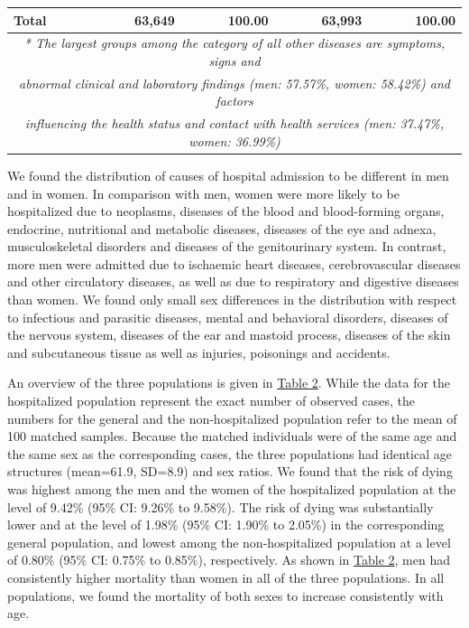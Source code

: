 \begin{table}[H]
\begin{tabular}{lrrrr}
    \midrule
    \textbf{Total } & \textbf{63,649} & \textbf{100.00} & \textbf{63,993} & \textbf{100.00} \\
    \bottomrule
    \bottomrule
\multicolumn{5}{c}{\textit{* The largest groups among the category of all other diseases are symptoms, signs and}}\\
\multicolumn{5}{c}{\textit{abnormal clinical and laboratory findings (men: 57.57\%, women: 58.42\%) and factors}} \\
\multicolumn{5}{c}{\textit{influencing the health status and contact with health services (men: 37.47\%, women: 36.99\%) }} \\
    \end{tabular}
\label{ch2:tab1}
\end{table}%

We found the distribution of causes of hospital admission to 
be different in men and in women. In comparison with men, women were more 
likely to be hospitalized due to neoplasms, diseases of the blood and 
blood-forming organs, endocrine, nutritional and metabolic diseases, 
diseases of the eye and adnexa, musculoskeletal disorders and diseases 
of the genitourinary system. In contrast, more men were admitted due to 
ischaemic heart diseases, cerebrovascular diseases and other circulatory 
diseases, as well as due to respiratory and digestive diseases than women. 
We found only small sex differences in the distribution with respect to 
infectious and parasitic diseases, mental and behavioral disorders, diseases 
of the nervous system, diseases of the ear and mastoid process, diseases 
of the skin and subcutaneous tissue as well as injuries, poisonings and 
accidents.

An overview of the three populations is given in \hyperref[ch2:tab2]{Table 2}. While the data 
for the hospitalized population represent the exact number of observed cases, 
the numbers for the general and the non-hospitalized population refer to 
the mean of 100 matched samples. Because the matched individuals were of 
the same age and the same sex as the corresponding cases, the three populations 
had identical age structures (mean=61.9, SD=8.9) and sex ratios. We found 
that the risk of dying was highest among the men and the women of the 
hospitalized population at the level of 9.42\% (95\% CI: 9.26\% to 9.58\%). 
The risk of dying was substantially lower and at the level of 1.98\% (95\% 
CI: 1.90\% to 2.05\%) in the corresponding general population, and lowest 
among the non-hospitalized population at a level of 0.80\% (95\% CI: 0.75\% 
to 0.85\%), respectively. As shown in \hyperref[ch2:tab2]{Table 2}, men had consistently higher
mortality than women in all of the three populations. In all populations, 
we found the mortality of both sexes to increase consistently with age.

